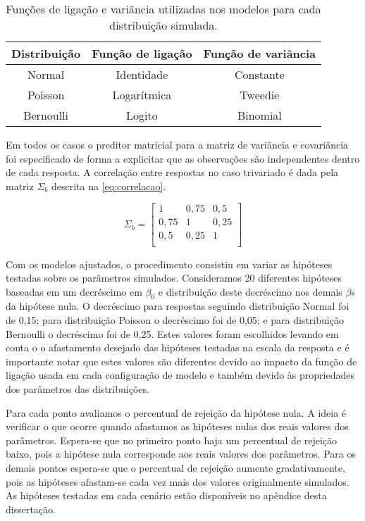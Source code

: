 \begin{table}[H]
\centering
\begin{tabular}{ccc}
\hline
Distribuição & Função de ligação & Função de variância \\ \hline
Normal       & Identidade        & Constante           \\
Poisson      & Logarítmica       & Tweedie             \\
Bernoulli    & Logito            & Binomial            \\ \hline
\end{tabular}
\caption{Funções de ligação e variância utilizadas nos modelos para cada distribuição simulada.}
\label{tab:link_var}
\end{table}

Em todos os casos o preditor matricial para a matriz de variância e covariância foi especificado de forma a explicitar que as observações são independentes dentro de cada resposta. A correlação entre respostas no caso trivariado é dada pela matriz $\Sigma_b$ descrita na \autoref{eq:correlacao}.

\begin{equation} \label{eq:correlacao}
\Sigma_b = 
\begin{bmatrix}
1    & 0,75 & 0,5  \\
0,75 & 1    & 0,25 \\
0,5  & 0,25 & 1    \\
\end{bmatrix}
\end{equation}

Com os modelos ajustados, o procedimento consistiu em variar as hipóteses testadas sobre os parâmetros simulados. Consideramos 20 diferentes hipóteses baseadas em um decréscimo em $\beta_0$ e distribuição deste decréscimo nos demais $\beta$s da hipótese nula. O decréscimo para respostas seguindo distribuição Normal foi de 0,15; para distribuição Poisson o decréscimo foi de 0,05; e para distribuição Bernoulli o decréscimo foi de 0,25. Estes valores foram escolhidos levando em conta o o afastamento desejado das hipóteses testadas na escala da resposta e é importante notar que estes valores são diferentes devido ao impacto da função de ligação usada em cada configuração de modelo e também devido às propriedades dos parâmetros das distribuições.

Para cada ponto avaliamos o percentual de rejeição da hipótese nula. A ideia é verificar o que ocorre quando afastamos as hipóteses nulas dos reais valores dos parâmetros. Espera-se que no primeiro ponto haja um percentual de rejeição baixo, pois a hipótese nula corresponde aos reais valores dos parâmetros. Para os demais pontos espera-se que o percentual de rejeição aumente gradativamente, pois as hipóteses afastam-se cada vez mais dos valores originalmente simulados. As hipóteses testadas em cada cenário estão disponíveis no apêndice desta dissertação.
 
